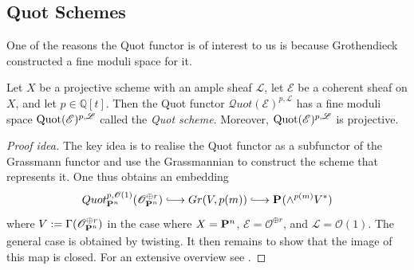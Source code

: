 \documentclass[12pt]{ociamthesis}  %
\begin{document}
\subsection{Quot Schemes}

One of the reasons the Quot functor is of interest to us is because
Grothendieck constructed a fine moduli space for it. \missingcitation

\begin{theorem}
  Let $X$ be a projective scheme with an ample sheaf $\mathscr L$,
  let $\mathscr E$ be a coherent sheaf on $X$, and let
  $p\in\mathbb{Q}[t]$. Then the Quot functor
  $\mathcal Quot(\mathscr E)^{p,\mathscr L}$ has a fine moduli space
  $\operatorname{Quot}(\mathscr E)^{p,\mathscr L}$ called the \emph{Quot scheme}.
  Moreover, $\operatorname{Quot}(\mathscr E)^{p,\mathscr L}$ is projective.
  \begin{proof}[Proof idea]
    The key idea is to realise the Quot functor as a subfunctor
    of the Grassmann functor and use the Grassmannian to construct the
    scheme that represents it. One thus obtains an embedding
    \begin{align}\label{eq:quot_embedding}
      Quot^{p,\mathscr O(1)}_{\projective{n}{}}(\mathscr O^{\oplus r}_{\projective{n}{}})
      \longinc Gr(V,p(m))
      \longinc \projective{}{}(\wedge^{p(m)}V^*)
    \end{align}
    where $V := \Gamma(\mathscr O^{\oplus r}_{\mathbf{P}^{n}_{}})$
    in the case where $X=\mathbf{P}^{n}_{}$, $\mathscr E=\mathscr O^{\oplus r}$,
    and $\mathscr L=\mathscr O(1)$. The general case is obtained by
    twisting.
    It then remains to show that the image of this map is closed.
    For an extensive overview see \cite[70-73]{hoskins2016}.
  \end{proof}
\end{theorem}
\end{document}
